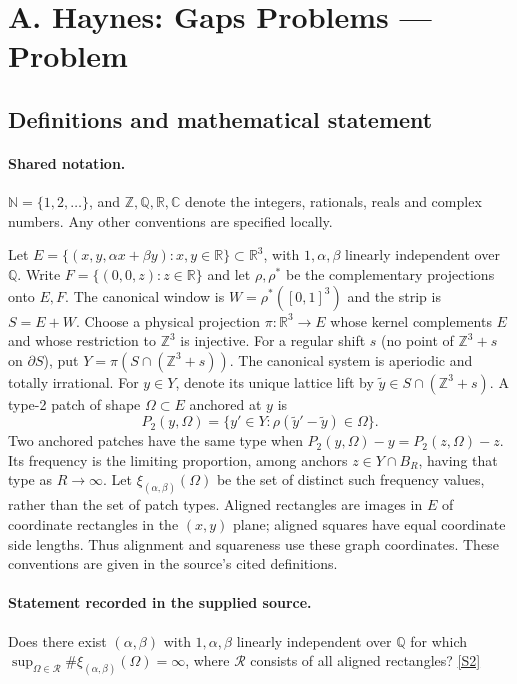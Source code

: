 \documentclass[11pt]{article}
\newcommand{\sref}[2]{\hyperlink{source:#1:#2}{[S#2]}}
\begin{document}
\section{A. Haynes: Gaps Problems — Problem}\label{statement}

\subsection{Definitions and mathematical statement}

\paragraph{Shared notation.}$\mathbb N=\{1,2,\ldots\}$, and $\mathbb Z,\mathbb Q,\mathbb R,\mathbb C$ denote the integers, rationals, reals and complex numbers. Any other conventions are specified locally.


Let $E=\{(x,y,\alpha x+\beta y):x,y\in\mathbb R\}\subset\mathbb R^3$, with $1,\alpha,\beta$ linearly independent over $\mathbb Q$. Write $F=\{(0,0,z):z\in\mathbb R\}$ and let $\rho,\rho^*$ be the complementary projections onto $E,F$. The canonical window is $W=\rho^*([0,1]^3)$ and the strip is $S=E+W$. Choose a physical projection $\pi:\mathbb R^3\to E$ whose kernel complements $E$ and whose restriction to $\mathbb Z^3$ is injective. For a regular shift $s$ (no point of $\mathbb Z^3+s$ on $\partial S$), put $Y=\pi(S\cap(\mathbb Z^3+s))$. The canonical system is aperiodic and totally irrational. For $y\in Y$, denote its unique lattice lift by $\widetilde y\in S\cap(\mathbb Z^3+s)$. A type-2 patch of shape $\Omega\subset E$ anchored at $y$ is
\[P_2(y,\Omega)=\{y'\in Y:\rho(\widetilde y'-\widetilde y)\in\Omega\}.\]
Two anchored patches have the same type when $P_2(y,\Omega)-y=P_2(z,\Omega)-z$. Its frequency is the limiting proportion, among anchors $z\in Y\cap B_R$, having that type as $R\to\infty$. Let $\xi_{(\alpha,\beta)}(\Omega)$ be the set of distinct such frequency values, rather than the set of patch types. Aligned rectangles are images in $E$ of coordinate rectangles in the $(x,y)$ plane; aligned squares have equal coordinate side lengths. Thus alignment and squareness use these graph coordinates. These conventions are given in the source’s cited definitions.
\paragraph{Statement recorded in the supplied source.}
Does there exist $(\alpha,\beta)$ with $1,\alpha,\beta$ linearly independent over $\mathbb Q$ for which $\sup_{\Omega\in\mathcal R}\#\xi_{(\alpha,\beta)}(\Omega)=\infty$, where $\mathcal R$ consists of all aligned rectangles? \sref{statement}{2}
\end{document}
